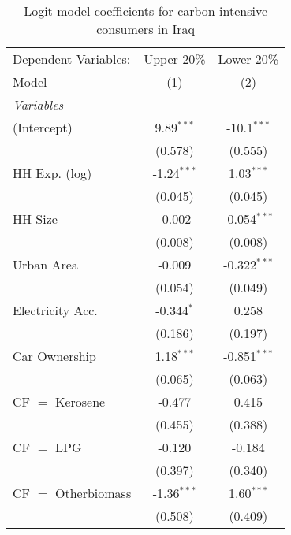 
\begin{table}[htbp!]
   \centering
   \small
   \begin{adjustbox}{width = 1\textwidth, max height = 0.95\textheight, center}
      \begin{threeparttable}[b]
         \caption{\label{tab:Logit_1_IRQ} Logit-model coefficients for carbon-intensive consumers in Iraq}
         \begin{tabular}{lcc}
            \tabularnewline \midrule \midrule
            Dependent Variables: & Upper 20\%    & Lower 20\%\\   
            Model                & (1)           & (2)\\  
            \midrule
            \emph{Variables}\\
            (Intercept)          & 9.89$^{***}$  & -10.1$^{***}$\\   
                                 & (0.578)       & (0.555)\\   
            HH Exp. (log)        & -1.24$^{***}$ & 1.03$^{***}$\\   
                                 & (0.045)       & (0.045)\\   
            HH Size              & -0.002        & -0.054$^{***}$\\   
                                 & (0.008)       & (0.008)\\   
            Urban Area           & -0.009        & -0.322$^{***}$\\   
                                 & (0.054)       & (0.049)\\   
            Electricity Acc.     & -0.344$^{*}$  & 0.258\\   
                                 & (0.186)       & (0.197)\\   
            Car Ownership        & 1.18$^{***}$  & -0.851$^{***}$\\   
                                 & (0.065)       & (0.063)\\   
            CF $=$ Kerosene      & -0.477        & 0.415\\   
                                 & (0.455)       & (0.388)\\   
            CF $=$ LPG           & -0.120        & -0.184\\   
                                 & (0.397)       & (0.340)\\   
            CF $=$ Otherbiomass  & -1.36$^{***}$ & 1.60$^{***}$\\   
                                 & (0.508)       & (0.409)\\   

\end{tabular}
\end{threeparttable}
\end{adjustbox}
\end{table}
